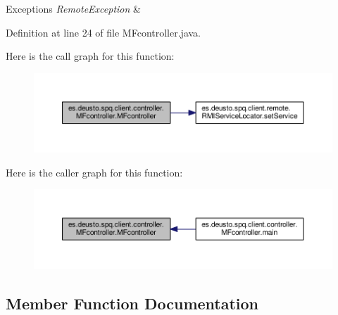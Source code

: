 \begin{DoxyExceptions}{Exceptions}
{\em Remote\+Exception} & \\
\hline
\end{DoxyExceptions}


Definition at line 24 of file M\+Fcontroller.\+java.



Here is the call graph for this function\+:\nopagebreak
\begin{figure}[H]
\begin{center}
\leavevmode
\includegraphics[width=350pt]{classes_1_1deusto_1_1spq_1_1client_1_1controller_1_1_m_fcontroller_ae3acf517cd787cc5db7f40194b50b3a6_cgraph}
\end{center}
\end{figure}




Here is the caller graph for this function\+:\nopagebreak
\begin{figure}[H]
\begin{center}
\leavevmode
\includegraphics[width=350pt]{classes_1_1deusto_1_1spq_1_1client_1_1controller_1_1_m_fcontroller_ae3acf517cd787cc5db7f40194b50b3a6_icgraph}
\end{center}
\end{figure}




\subsection{Member Function Documentation}
